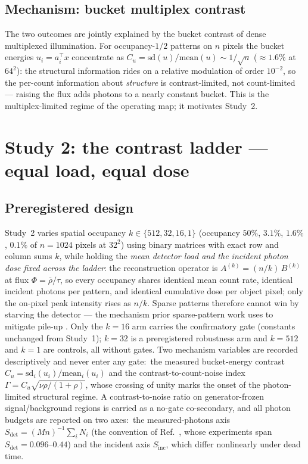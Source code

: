 \documentclass[10pt,twocolumn]{article}
\newcommand{\rhobar}{\bar{\rho}}
\newcommand{\Cu}{C_{u}}
\begin{document}
\subsection{Mechanism: bucket multiplex contrast}
The two outcomes are jointly explained by the bucket contrast of dense
multiplexed illumination. For occupancy-$1/2$ patterns on $n$ pixels the
bucket energies $u_i = a_i^{\top}x$ concentrate as
$\Cu = \mathrm{sd}(u)/\mathrm{mean}(u) \sim 1/\sqrt{n}$
($\approx 1.6\%$ at $64^{2}$): the structural information rides on a
relative modulation of order $10^{-2}$, so the per-count information about
\emph{structure} is contrast-limited, not count-limited --- raising the flux
adds photons to a nearly constant bucket. This is the multiplex-limited
regime of the operating map; it motivates Study~2.

\section{Study 2: the contrast ladder --- equal load, equal dose}
\label{sec:study2}
\subsection{Preregistered design}
Study~2 varies spatial occupancy $k \in \{512, 32, 16, 1\}$ (occupancy
$50\%$, $3.1\%$, $1.6\%$, $0.1\%$ of $n = 1024$ pixels at $32^{2}$) using
binary matrices with exact row and column sums $k$, while holding the
\emph{mean detector load and the incident photon dose fixed across the
ladder}: the reconstruction operator is $A^{(k)} = (n/k)\,B^{(k)}$ at flux
$\Phi = \rhobar/\tau$, so every occupancy shares identical mean count rate,
identical incident photons per pattern, and identical cumulative dose per
object pixel; only the on-pixel peak intensity rises as $n/k$. Sparse
patterns therefore cannot win by starving the detector --- the mechanism
prior sparse-pattern work uses to mitigate pile-up
\cite{liu2019pileup,han2025sparsehadamard}. Only the $k = 16$ arm carries the confirmatory
gate (constants unchanged from Study~1); $k = 32$ is a preregistered
robustness arm and $k = 512$ and $k = 1$ are controls, all without gates.
Two mechanism variables are recorded descriptively and never enter any
gate:\ the measured bucket-energy contrast $\Cu = \mathrm{sd}_i(u_i) /
\mathrm{mean}_i(u_i)$ and the contrast-to-count-noise index $\Gamma =
\Cu\sqrt{\nu\rho/(1+\rho)}$, whose crossing of unity marks the onset of
the photon-limited structural regime. A contrast-to-noise ratio on
generator-frozen signal/background regions is carried as a no-gate
co-secondary, and all photon budgets are reported on two axes:\ the
measured-photons axis $S_{\mathrm{det}} = (Mn)^{-1}\sum_i N_i$ (the
convention of Ref.~\cite{hao2025photonlimited}, whose experiments span
$S_{\mathrm{det}} = 0.096$--$0.44$) and the incident axis
$S_{\mathrm{inc}}$, which differ nonlinearly under dead time.
\end{document}
